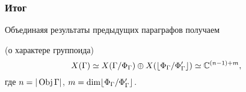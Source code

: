 \subsubsection{Итог}
Объединаяя результаты предыдущих параграфов получаем
\begin{theorem} (о характере группоида)
    \[X(\Gamma) \simeq X(\Gamma/\Phi_\Gamma) \oplus X(\lfloor \Phi_\Gamma / \Phi_\Gamma' \rfloor) \simeq \mathbb{C}^{(n-1)+m},\]
    где $n = | \operatorname*{Obj} \Gamma |$, $m = \dim \lfloor \Phi_\Gamma / \Phi_\Gamma' \rfloor$.
\end{theorem}